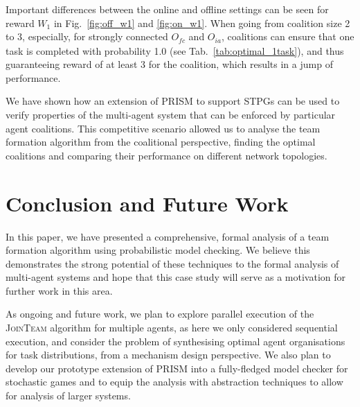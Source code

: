 \documentclass{llncs}
\begin{document}
Important differences between the online and offline settings can be seen for reward $W_1$ in Fig.~\ref{fig:off_w1} and \ref{fig:on_w1}. When going from coalition size 2 to 3, especially, for strongly connected $O_{\mathit{fc}}$ and $O_{ia}$, coalitions can ensure that one task is completed with probability 1.0 (see Tab.~\ref{tab:optimal_1task}), and thus guaranteeing reward of at least 3 for the coalition, which results in a jump of performance.

We have shown how an extension of PRISM to support STPGs can be used to verify properties of the multi-agent system that can be enforced by particular agent coalitions. This competitive  scenario allowed us to analyse the team formation algorithm from the coalitional perspective, finding the optimal coalitions and comparing their performance on different network topologies.

\section{Conclusion and Future Work}
In this paper, we have presented a comprehensive, formal analysis of a team formation algorithm using probabilistic model checking. We believe this demonstrates the strong potential of these techniques to the formal analysis of multi-agent systems and hope that this case study will serve as a motivation for further work in this area.

As ongoing and future work,
we plan to explore parallel execution of the \textsc{JoinTeam} algorithm for multiple agents, as here we only considered sequential execution, and consider the problem of synthesising optimal agent organisations for task distributions, from a mechanism design perspective.
We also plan to develop our prototype extension of PRISM
into a fully-fledged model checker for stochastic games
and to equip the analysis with abstraction techniques to allow for analysis of larger systems.

\end{document}
